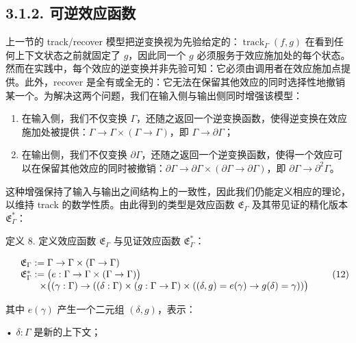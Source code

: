 \subsection{3.1.2. 可逆效应函数}\label{revertible-efect-functions}

上一节的 track/recover 模型把逆变换视为先验给定的：\(\operatorname { t r a c k } _ { \Gamma } ( f , g )\) 在看到任何上下文状态之前就固定了 \(g\)，因此同一个 \(g\) 必须服务于效应施加处的每个状态。然而在实践中，每个效应的逆变换并非先验可知：它必须由调用者在效应施加点提供。此外，recover 是全有或全无的：它无法在保留其他效应的同时选择性地撤销某一个。为解决这两个问题，我们在输入侧与输出侧同时增强该模型：

\begin{enumerate}
\def\labelenumi{\arabic{enumi}.}
\item
  在输入侧，我们不仅变换 $\Gamma$，还随之返回一个逆变换函数，使得逆变换在效应施加处被提供：\(\Gamma \to \Gamma \times ( \Gamma \to \Gamma )\)，即
  \(\Gamma \to \partial \Gamma\)；
\item
  在输出侧，我们不仅变换 \(\partial \Gamma\)，还随之返回一个逆变换函数，使得一个效应可以在保留其他效应的同时被撤销：\(\partial \Gamma \to \partial \Gamma \times ( \partial \Gamma \to \partial \Gamma )\)，即
  \(\partial \Gamma \to \partial ^ { 2 } \Gamma\)。
\end{enumerate}

这种增强保持了输入与输出之间结构上的一致性，因此我们仍能定义相应的理论，以维持 track 的数学性质。由此得到的类型是效应函数 \(\mathfrak { E } _ { \Gamma }\) 及其带见证的精化版本
\({ \mathfrak { E } } _ { \Gamma } ^ { * }\)：

定义 8. 定义效应函数 \(\mathfrak { E } _ { \Gamma }\) 与见证效应函数
\({ \mathfrak { E } } _ { \Gamma } ^ { * }\)：

\[
\begin{array} { r l }
  & \mathfrak { E } _ { \Gamma } : = \Gamma \to \Gamma \times ( \Gamma \to \Gamma ) \\
  & \mathfrak { E } _ { \Gamma } ^ { * } : = \big ( e : \Gamma \to \Gamma \times ( \Gamma \to \Gamma ) \big ) \\
  & \quad \quad \times \big ( ( \gamma : \Gamma ) \to ( ( \delta : \Gamma ) \times ( g : \Gamma \to \Gamma ) \times ( ( \delta , g ) = e ( \gamma ) \to g ( \delta ) = \gamma ) ) \big )
\end{array}\tag{12}
\]

其中 \(e ( \gamma )\) 产生一个二元组 \(( \delta , g )\)，表示：

• \(\delta : \Gamma\) 是新的上下文；

